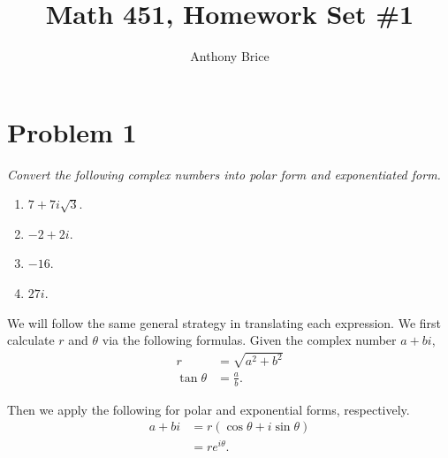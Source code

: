 \documentclass{tufte-handout}
\title{Math 451, Homework Set \#1}
\author{Anthony Brice}
\begin{document}
\maketitle

\section{Problem 1}

\emph{Convert the following complex numbers into polar form
    and exponentiated form.}
\begin{enumerate}[label=\emph{(\alph*)}]
\item $7 + 7i\sqrt{3}$.
\item $-2 + 2i$.
\item $-16$.
\item $27i$.
\end{enumerate}

\bigskip

We will follow the same general strategy in translating each
expression. We first calculate $r$ and $\theta$ via the following
formulas. Given the complex number $a + bi$,
\begin{align*}
  r &= \sqrt{a^2 + b^2}\\
  \tan \theta &= \frac{a}{b}.
\end{align*}

Then we apply the following for polar and exponential forms, respectively.
\begin{align*}
  a + bi &= r \left( \cos \theta + i \sin \theta \right)\\
         &= r e^{i \theta}.
\end{align*}
\end{document}
